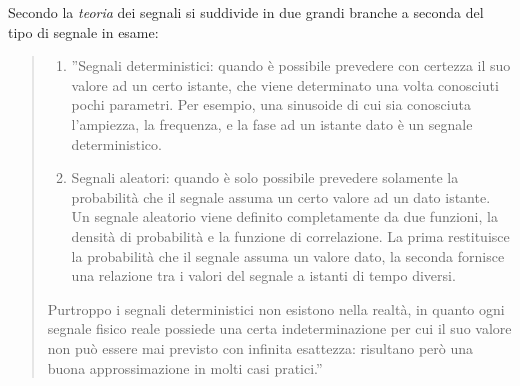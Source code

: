\documentclass[a4paper]{report} %
\begin{document}
Secondo \cite{art:rif.2} la \textit{teoria} dei segnali si suddivide in due grandi branche a seconda del tipo di segnale in esame: 
\begin{quote}
	\begin{enumerate}
	\item ''Segnali deterministici: quando è possibile prevedere con certezza il suo valore ad un certo istante, che viene determinato una volta conosciuti pochi parametri. Per esempio, una sinusoide di cui sia conosciuta l'ampiezza, la frequenza, e la fase ad un istante dato è un segnale deterministico. 
	\item Segnali aleatori: quando è solo possibile prevedere solamente la probabilità che il segnale assuma un certo valore ad un dato istante. Un segnale aleatorio viene definito completamente da due funzioni, la densità di probabilità e la funzione di correlazione. La prima restituisce la probabilità che il segnale assuma un valore dato, la seconda fornisce una relazione tra i valori del segnale a istanti di tempo diversi.
	\end{enumerate}
	Purtroppo i segnali deterministici non esistono nella realtà, in quanto ogni segnale fisico reale possiede una certa indeterminazione per cui il suo valore non può essere mai previsto con infinita esattezza: risultano però una buona approssimazione in molti casi pratici.''
\end{quote}
 
\end{document}
